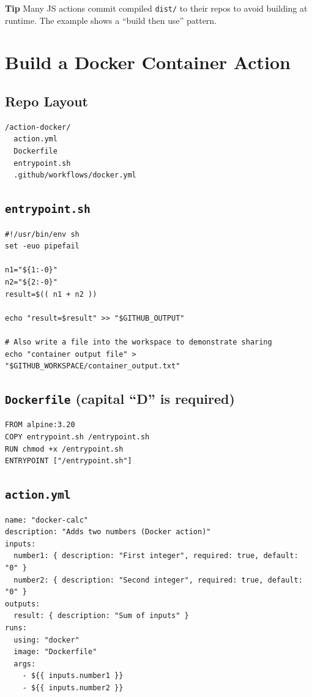 \documentclass[11pt]{article}
\begin{document}
\begin{tcolorbox}
\textbf{Tip} Many JS actions commit compiled \texttt{dist/} to their repos to avoid building at runtime. The example shows a ``build then use'' pattern.
\end{tcolorbox}
\clearpage

\section{Build a Docker Container Action}
\subsection*{Repo Layout}
\begin{verbatim}
/action-docker/
  action.yml
  Dockerfile
  entrypoint.sh
  .github/workflows/docker.yml
\end{verbatim}

\subsection*{\texttt{entrypoint.sh}}
\begin{verbatim}
#!/usr/bin/env sh
set -euo pipefail

n1="${1:-0}"
n2="${2:-0}"
result=$(( n1 + n2 ))

echo "result=$result" >> "$GITHUB_OUTPUT"

# Also write a file into the workspace to demonstrate sharing
echo "container output file" > "$GITHUB_WORKSPACE/container_output.txt"
\end{verbatim}

\subsection*{\texttt{Dockerfile} (capital ``D'' is required)}
\begin{verbatim}
FROM alpine:3.20
COPY entrypoint.sh /entrypoint.sh
RUN chmod +x /entrypoint.sh
ENTRYPOINT ["/entrypoint.sh"]
\end{verbatim}

\subsection*{\texttt{action.yml}}
\begin{verbatim}
name: "docker-calc"
description: "Adds two numbers (Docker action)"
inputs:
  number1: { description: "First integer", required: true, default: "0" }
  number2: { description: "Second integer", required: true, default: "0" }
outputs:
  result: { description: "Sum of inputs" }
runs:
  using: "docker"
  image: "Dockerfile"
  args:
    - ${{ inputs.number1 }}
    - ${{ inputs.number2 }}
\end{verbatim}
\clearpage
\end{document}
